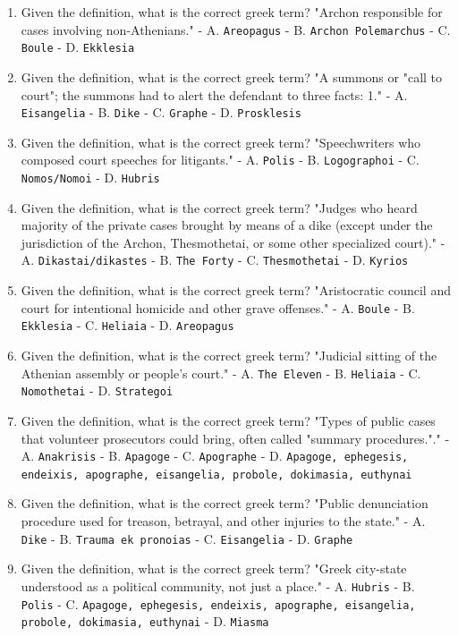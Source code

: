 \documentclass[11pt]{article}
\begin{document}
\begin{enumerate}
\item Given the definition, what is the correct greek term? "Archon responsible for cases involving non-Athenians." - A. \texttt{Areopagus} - B. \texttt{Archon Polemarchus} - C. \texttt{Boule} - D. \texttt{Ekklesia}
\item Given the definition, what is the correct greek term? "A summons or "call to court"; the summons had to alert the defendant to three facts: 1." - A. \texttt{Eisangelia} - B. \texttt{Dike} - C. \texttt{Graphe} - D. \texttt{Prosklesis}
\item Given the definition, what is the correct greek term? "Speechwriters who composed court speeches for litigants." - A. \texttt{Polis} - B. \texttt{Logographoi} - C. \texttt{Nomos/Nomoi} - D. \texttt{Hubris}
\item Given the definition, what is the correct greek term? "Judges who heard majority of the private cases brought by means of a dike (except under the jurisdiction of the Archon, Thesmothetai, or some other specialized court)." - A. \texttt{Dikastai/dikastes} - B. \texttt{The Forty} - C. \texttt{Thesmothetai} - D. \texttt{Kyrios}
\item Given the definition, what is the correct greek term? "Aristocratic council and court for intentional homicide and other grave offenses." - A. \texttt{Boule} - B. \texttt{Ekklesia} - C. \texttt{Heliaia} - D. \texttt{Areopagus}
\item Given the definition, what is the correct greek term? "Judicial sitting of the Athenian assembly or people's court." - A. \texttt{The Eleven} - B. \texttt{Heliaia} - C. \texttt{Nomothetai} - D. \texttt{Strategoi}
\item Given the definition, what is the correct greek term? "Types of public cases that volunteer prosecutors could bring, often called "summary procedures."." - A. \texttt{Anakrisis} - B. \texttt{Apagoge} - C. \texttt{Apographe} - D. \texttt{Apagoge, ephegesis, endeixis, apographe, eisangelia, probole, dokimasia, euthynai}
\item Given the definition, what is the correct greek term? "Public denunciation procedure used for treason, betrayal, and other injuries to the state." - A. \texttt{Dike} - B. \texttt{Trauma ek pronoias} - C. \texttt{Eisangelia} - D. \texttt{Graphe}
\item Given the definition, what is the correct greek term? "Greek city-state understood as a political community, not just a place." - A. \texttt{Hubris} - B. \texttt{Polis} - C. \texttt{Apagoge, ephegesis, endeixis, apographe, eisangelia, probole, dokimasia, euthynai} - D. \texttt{Miasma}

\end{enumerate}
\end{document}
